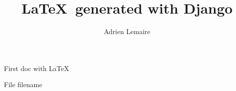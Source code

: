 \documentclass[a4paper]{article}
\title{\LaTeX\ generated with Django}
\author{Adrien Lemaire}
\begin{document}
\maketitle

First doc with \LaTeX

File {{ filename }} %
\end{document}

